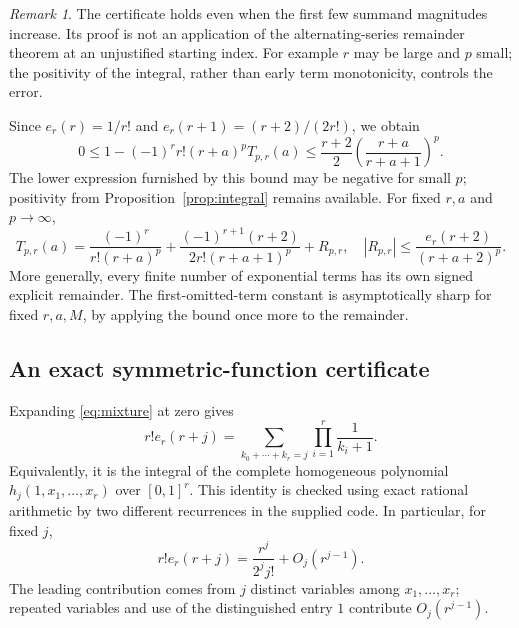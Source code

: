 \documentclass[11pt]{article}
\numberwithin{equation}{section}
\theoremstyle{definition}\newtheorem{definition}[theorem]{Definition}
\theoremstyle{remark}\newtheorem{remark}[theorem]{Remark}
\begin{document}
\begin{remark}
The certificate holds even when the first few summand magnitudes increase. Its proof is not an application of the alternating-series remainder theorem at an unjustified starting index. For example $r$ may be large and $p$ small; the positivity of the integral, rather than early term monotonicity, controls the error.
\end{remark}

Since $e_r(r)=1/r!$ and $e_r(r+1)=(r+2)/(2r!)$, we obtain
\begin{equation}\label{eq:relative}
0\le 1-(-1)^rr!(r+a)^pT_{p,r}(a)
 \le\frac{r+2}{2}\left(\frac{r+a}{r+a+1}\right)^p.
\end{equation}
The lower expression furnished by this bound may be negative for small $p$; positivity from Proposition~\ref{prop:integral} remains available. For fixed $r,a$ and $p\to\infty$,
\begin{equation}\label{eq:fixedr}
T_{p,r}(a)=\frac{(-1)^r}{r!(r+a)^p}
 +\frac{(-1)^{r+1}(r+2)}{2r!(r+a+1)^p}
 +R_{p,r},\quad
 |R_{p,r}|\le\frac{e_r(r+2)}{(r+a+2)^p}.
\end{equation}
More generally, every finite number of exponential terms has its own signed explicit remainder. The first-omitted-term constant is asymptotically sharp for fixed $r,a,M$, by applying the bound once more to the remainder.

\subsection{An exact symmetric-function certificate}
Expanding \eqref{eq:mixture} at zero gives
\begin{equation}\label{eq:composition}
 r!e_r(r+j)=
 \sum_{k_0+\cdots+k_r=j}\prod_{i=1}^r\frac1{k_i+1}.
\end{equation}
Equivalently, it is the integral of the complete homogeneous polynomial
$h_j(1,x_1,\ldots,x_r)$ over $[0,1]^r$. This identity is checked using exact rational arithmetic by two different recurrences in the supplied code. In particular, for fixed $j$,
\begin{equation}\label{eq:coefficientAsymp}
 r!e_r(r+j)=\frac{r^j}{2^j j!}+O_j(r^{j-1}).
\end{equation}
The leading contribution comes from $j$ distinct variables among $x_1,\ldots,x_r$; repeated variables and use of the distinguished entry $1$ contribute $O_j(r^{j-1})$.
\end{document}
